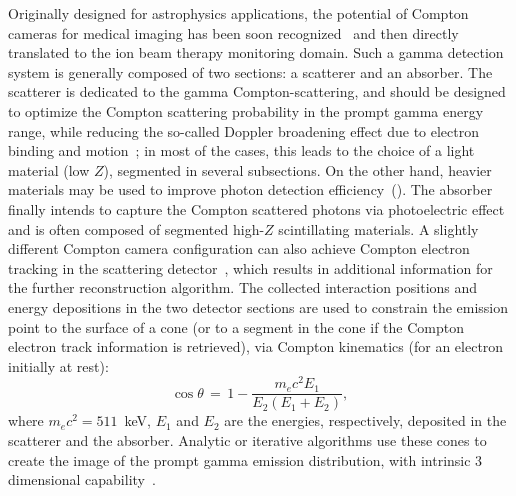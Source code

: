 Originally designed for astrophysics applications, the potential of Compton cameras for medical imaging has been soon recognized~\cite{TODD:1974aa} and then directly translated to the ion beam therapy monitoring domain. Such a gamma detection system is generally  composed of two sections: a scatterer and an absorber. The scatterer is dedicated to the gamma Compton-scattering, and should be designed to optimize the Compton scattering probability in the prompt gamma energy range, while reducing the so-called Doppler broadening effect due to electron binding and motion~\cite{Doppler}; in most of the cases, this leads to the choice of a light material (low $Z$), segmented in several subsections. On the other hand, heavier materials may be used to improve photon detection efficiency~(\cite{Solevi:2016aa, ALDAWOOD2017190, 0031-9155-60-18-7085}). The absorber finally intends to capture the Compton scattered photons via photoelectric effect and is often composed of segmented high-$Z$ scintillating materials. A slightly different Compton camera configuration can also achieve Compton electron tracking in the scattering detector~\cite{Frandes_2010, Yoshihara_ETCC}, which results in additional information for the further reconstruction algorithm.
 The collected interaction positions and energy depositions in the two detector sections are used to constrain the emission point to the surface of a cone (or to a segment in the cone if the Compton electron track information is retrieved), via Compton kinematics (for an electron initially at rest):
\begin{equation}
\cos\theta\,=\,1-\frac{m_{e}c^{2}E_{1}}{E_{2}(E_{1}+E_{2})},
\label{Compton_equation}
\end{equation} 
where \(m_{e}c^{2} = 511\)~keV, \(E_{1}\) and \(E_{2}\) are the energies, respectively, deposited in the scatterer and the absorber. 
Analytic or iterative algorithms use these cones to create the image of the prompt gamma emission distribution, with intrinsic 3 dimensional capability~\cite{McKisson3D, Kuchment:2016uiw}. 


